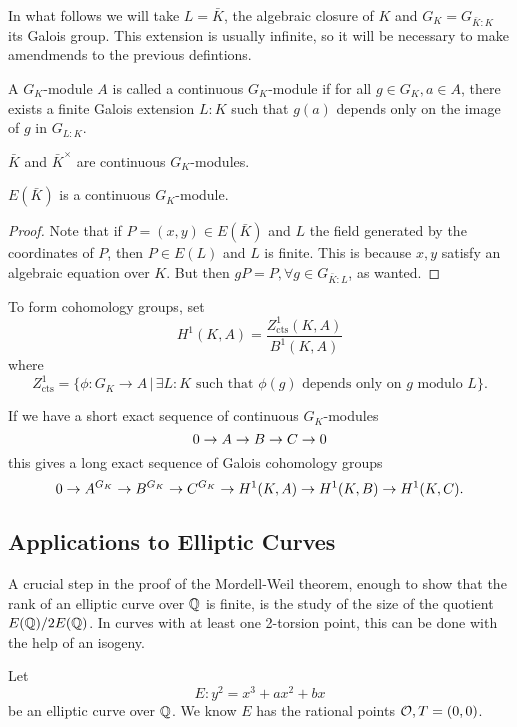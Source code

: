 \documentclass[12pt, a4paper]{amsart}
\begin{document}
In what follows we will take $L = \bar{K}$, the algebraic closure of $K$ and
$G_K = G_{\bar{K}:K}$ its Galois group. This extension is usually infinite, so
it will be necessary to make amendmends to the previous defintions.

\begin{defn}
  A $G_K$-module $A$ is called a continuous $G_K$-module if for all $g \in G_K, a \in A$,
  there exists a finite Galois extension $L:K$ such that $g(a)$
  depends only on the image of $g$ in $G_{L:K}$.
\end{defn}

\begin{example}
  $\bar{K}$ and $ \bar{K}^{\times}$ are continuous $G_K$-modules.
\end{example}

\begin{lemma}
  $E(\bar{K})$ is a continuous $G_K$-module.
\end{lemma}
\begin{proof}
  Note that if $P = (x,y) \in E(\bar{K})$ and $L$ the field generated
  by the coordinates of $P$, then $P \in E(L)$ and $L$ is finite. This is
  because $x, y$ satisfy an algebraic equation over $K$. But then
  $g P = P, \forall g \in G_{\bar{K} : L}$, as wanted.
\end{proof}
  
To form cohomology groups, set
\[H^1(K,A) = \frac{Z^1_{\text{cts}}(K,A)}{B^1(K,A)}\]
where
\[Z^1_{\text{cts}} = \{\phi : G_K \rightarrow A \, | \, \exists L : K
  \text{ such that } \phi(g) \text{ depends only on } g \text{ modulo } L\}.\]

If we have a short exact sequence of continuous $G_K$-modules
\[ 0 \rightarrow A \rightarrow B \rightarrow C \rightarrow 0\]
this gives a long exact sequence of Galois cohomology groups
\[0 \rightarrow A^{G_K} \rightarrow B^{G_K} \rightarrow C^{G_K} \rightarrow H^1(K,A) \rightarrow H^1(K,B) \rightarrow H^1(K,C).\]


\subsection{Applications to Elliptic Curves} \label{sec:applications}
A crucial step in the proof of the Mordell-Weil theorem, enough to show that
the rank of an elliptic curve over ${\mathbb Q}$ is finite, is the study of the size
of the quotient $E({\mathbb Q}) / 2 E({\mathbb Q})$. In curves with at least one 2-torsion
point, this can be done with the help of an isogeny.

Let $$E : y^2 = x^3 + ax^2 + bx$$ be an elliptic curve over ${\mathbb Q}$. We know $E$
has the rational points ${\mathcal O}, T = (0,0)$.
\end{document}
